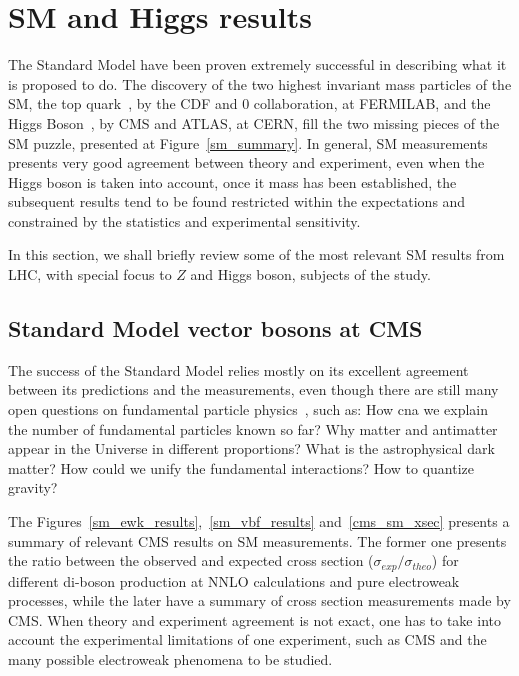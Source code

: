 \section{SM and Higgs results}
\label{section_sm_higgs}

The Standard Model have been proven extremely successful in describing what it is proposed to do. The discovery of the two highest invariant mass particles of the SM, the top quark~\cite{top_discovery_cdf,top_discovery_d0}, by the CDF and 0 collaboration, at FERMILAB, and the Higgs Boson~\cite{higgs_discovery_cms,higgs_discovery_atlas}, by CMS and ATLAS, at CERN, fill the two missing pieces of the SM puzzle, presented at Figure~\ref{sm_summary}. In general, SM measurements presents very good agreement between theory and experiment, even when the Higgs boson is taken into account, once it mass has been established, the subsequent results tend to be found restricted within the expectations and constrained by the statistics and experimental sensitivity.  

In this section, we shall briefly review some of the most relevant SM results from LHC, with special focus to $Z$ and Higgs boson, subjects of the study. 

\subsection{Standard Model vector bosons at CMS}
\label{section_sm_vb_results}


The success of the Standard Model relies mostly on its excellent agreement between its predictions and the measurements, even though there are still many open questions on fundamental particle physics~\cite{open_questions}, such as: How cna we explain the number of fundamental particles known so far? Why matter and antimatter appear in the Universe in different proportions? What is the astrophysical dark matter? How could we unify the fundamental interactions? How to quantize gravity? 

The Figures~\ref{sm_ewk_results},~\ref{sm_vbf_results} and~\ref{cms_sm_xsec} presents a summary of relevant CMS results on SM measurements. The former one presents the ratio between the observed and expected cross section ($\sigma_{exp}/\sigma_{theo}$) for different di-boson production at NNLO calculations and pure electroweak processes, while the later have a summary of cross section measurements made by CMS. When theory and experiment agreement is not exact, one has to take into account the experimental limitations of one experiment, such as CMS and the many possible electroweak phenomena to be studied.


